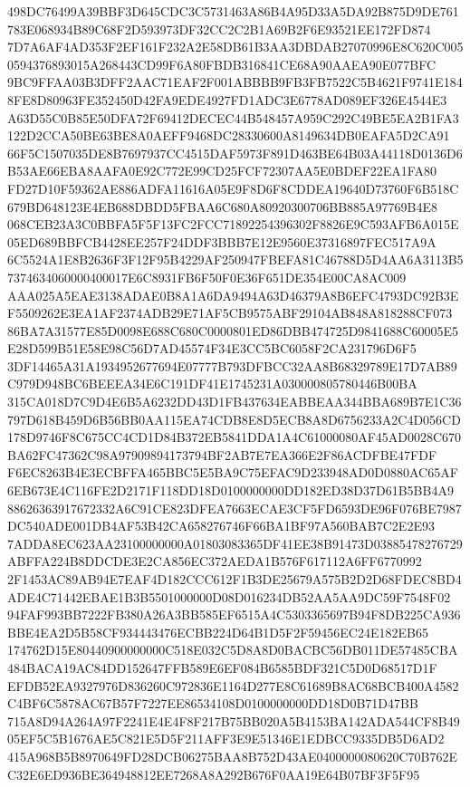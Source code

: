 \documentclass[UTF8,fontset=fandol,zihao=-4,a4paper]{ctexart}
\begin{document}
{{498DC76499A39BBF3D645CDC3C5731463A86B4A95D33A5DA92B875D9DE761783E068934B89C68F2D593973DF32CC2C2B1A69B2F6E93521EE172FD874
7D7A6AF4AD353F2EF161F232A2E58DB61B3AA3DBDAB27070996E8C620C0050594376893015A268443CD99F6A80FBDB316841CE68A90AAEA90E077BFC
9BC9FFAA03B3DFF2AAC71EAF2F001ABBBB9FB3FB7522C5B4621F9741E1848FE8D80963FE352450D42FA9EDE4927FD1ADC3E6778AD089EF326E4544E3
A63D55C0B85E50DFA72F69412DECEC44B548457A959C292C49BE5EA2B1FA3122D2CCA50BE63BE8A0AEFF9468DC28330600A8149634DB0EAFA5D2CA91
66F5C1507035DE8B7697937CC4515DAF5973F891D463BE64B03A44118D0136D6B53AE66EBA8AAFA0E92C772E99CD25FCF72307AA5E0BDEF22EA1FA80
FD27D10F59362AE886ADFA11616A05E9F8D6F8CDDEA19640D73760F6B518C679BD648123E4EB688DBDD5FBAA6C680A80920300706BB885A97769B4E8
068CEB23A3C0BBFA5F5F13FC2FCC71892254396302F8826E9C593AFB6A015E05ED689BBFCB4428EE257F24DDF3BBB7E12E9560E37316897FEC517A9A
6C5524A1E8B2636F3F12F95B4229AF250947FBEFA81C46788D5D4AA6A3113B57374634060000400017E6C8931FB6F50F0E36F651DE354E00CA8AC009
AAA025A5EAE3138ADAE0B8A1A6DA9494A63D46379A8B6EFC4793DC92B3EF5509262E3EA1AF2374ADB29E71AF5CB9575ABF29104AB848A818288CF073
86BA7A31577E85D0098E688C680C0000801ED86DBB474725D9841688C60005E5E28D599B51E58E98C56D7AD45574F34E3CC5BC6058F2CA231796D6F5
3DF14465A31A1934952677694E07777B793DFBCC32AA8B68329789E17D7AB89C979D948BC6BEEEA34E6C191DF41E1745231A030000805780446B00BA
315CA018D7C9D4E6B5A6232DD43D1FB437634EABBEAA344BBA689B7E1C36797D618B459D6B56BB0AA115EA74CDB8E8D5ECB8A8D6756233A2C4D056CD
178D9746F8C675CC4CD1D84B372EB5841DDA1A4C61000080AF45AD0028C670BA62FC47362C98A97909894173794BF2AB7E7EA366E2F86ACDFBE47FDF
F6EC8263B4E3ECBFFA465BBC5E5BA9C75EFAC9D233948AD0D0880AC65AF6EB673E4C116FE2D2171F118DD18D0100000000DD182ED38D37D61B5BB4A9
88626363917672332A6C91CE823DFEA7663ECAE3CF5FD6593DE96F076BE7987DC540ADE001DB4AF53B42CA658276746F66BA1BF97A560BAB7C2E2E93
7ADDA8EC623AA23100000000A01803083365DF41EE38B91473D03885478276729ABFFA224B8DDCDE3E2CA856EC372AEDA1B576F617112A6FF6770992
2F1453AC89AB94E7EAF4D182CCC612F1B3DE25679A575B2D2D68FDEC8BD4ADE4C71442EBAE1B3B5501000000D08D016234DB52AA5AA9DC59F7548F02
94FAF993BB7222FB380A26A3BB585EF6515A4C5303365697B94F8DB225CA936BBE4EA2D5B58CF934443476ECBB224D64B1D5F2F59456EC24E182EB65
174762D15E80440900000000C518E032C5D8A8D0BACBC56DB011DE57485CBA484BACA19AC84DD152647FFB589E6EF084B6585BDF321C5D0D68517D1F
EFDB52EA9327976D836260C972836E1164D277E8C61689B8AC68BCB400A4582C4BF6C5878AC67B57F7227EE86534108D0100000000DD18D0B71D47BB
715A8D94A264A97F2241E4E4F8F217B75BB020A5B4153BA142ADA544CF8B4905EF5C5B1676AE5C821E5D5F211AFF3E9E51346E1EDBCC9335DB5D6AD2
415A968B5B8970649FD28DCB06275BAA8B752D43AE0400000080620C70B762EC32E6ED936BE364948812EE7268A8A292B676F0AA19E64B07BF3F5F95
}}
\end{document}
